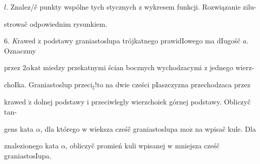 \documentclass[a4paper,12pt]{article}
\begin{document}
$l$. Znalez/č punkty wspólne tych stycznych $\mathrm{z}$ wykresem funkcji. Rozwiązanie zilu-

strowač odpowiednim rysunkiem.

6. {\it K}rawed $\acute{\mathrm{z}}$ podstawy graniastoslupa trójkatnego prawidIowego ma dIugośč $a$. Oznaczmy

przez $ 2\alpha \mathrm{k}\mathrm{a}\mathrm{t}$ miedzy przekatnymi ścian bocznych wychodzacymi $\mathrm{z}$ jednego wierz-

choIka. Graniastoslup $\mathrm{p}\mathrm{r}\mathrm{z}\mathrm{e}\mathrm{c}\mathrm{i}_{\xi}!\mathrm{t}\mathrm{o}$ na dwie cześci pIaszczyzna przechodzaca przez

krawed $\acute{\mathrm{z}}$ dolnej podstawy $\mathrm{i}$ przeciwlegly wierzchoiek górnej podstawy. Obliczyč tan-

gens kata $\alpha$, dla którego $\mathrm{w}$ wieksza cześč graniastoslupa $\mathrm{m}\mathrm{o}\dot{\mathrm{z}}$ na wpisač kule. Dla

znalezionego kata $\alpha$, obliczyč promień kuli wpisanej $\mathrm{w}$ mniejsza cześč graniastosIupa.
\end{document}
